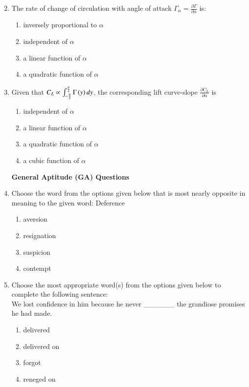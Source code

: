 \documentclass[journal,9pt,onecolumn]{IEEEtran}
\begin{document}
\begin{enumerate}
\setcounter{enumi}{1}
\item The rate of change of circulation with angle of attack $\Gamma_\alpha=\frac{\partial \Gamma}{\partial \alpha}$ is:
   \begin{multicols}{2}
   \begin{enumerate}
       \item inversely proportional to $\alpha$
       \item independent of $\alpha$
       \item a linear function of $\alpha$
       \item a quadratic function of $\alpha$
   \end{enumerate}
   \end{multicols}

\item Given that $C_L \propto \int_{-\frac{b}{2}}^{\frac{b}{2}} \Gamma\left(y\right) d y$, the corresponding lift curve-slope $\frac{\partial C_L}{\partial \alpha}$ is
   \begin{multicols}{2}
   \begin{enumerate}
       \item independent of $\alpha$
       \item a linear function of $\alpha$
       \item a quadratic function of $\alpha$
       \item a cubic function of $\alpha$
   \end{enumerate}
   \end{multicols}
\textbf{General Aptitude (GA) Questions}\\
\item Choose the word from the options given below that is most nearly opposite in meaning to the given word: Deference
   \begin{multicols}{4}
   \begin{enumerate}
       \item aversion
       \item resignation
       \item suspicion
       \item contempt
   \end{enumerate}
   \end{multicols}

\item Choose the most appropriate word(s) from the options given below to complete the following sentence: \\We lost confidence in him because he never \_\_\_\_\_\_ the grandiose promises he had made.
   \begin{multicols}{4}
   \begin{enumerate}
       \item delivered
       \item delivered on
       \item forgot
       \item reneged on
   \end{enumerate}
   \end{multicols}



\end{enumerate}
\end{document}
